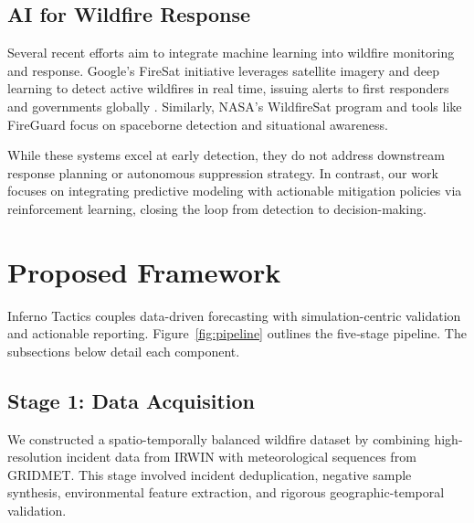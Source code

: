 \documentclass[conference]{IEEEtran}
\begin{document}
\subsection{AI for Wildfire Response}
Several recent efforts aim to integrate machine learning into wildfire monitoring and response. Google’s FireSat initiative leverages satellite imagery and deep learning to detect active wildfires in real time, issuing alerts to first responders and governments globally \cite{googlefiresat2023}. Similarly, NASA’s WildfireSat program \cite{wildfiresat2022} and tools like FireGuard focus on spaceborne detection and situational awareness.

While these systems excel at early detection, they do not address downstream response planning or autonomous suppression strategy. In contrast, our work focuses on integrating predictive modeling with actionable mitigation policies via reinforcement learning, closing the loop from detection to decision-making.

\section{Proposed Framework}

Inferno Tactics couples data-driven forecasting with simulation-centric validation and actionable reporting. Figure~\ref{fig:pipeline} outlines the five‐stage pipeline. The subsections below detail each component.

\subsection{Stage 1: Data Acquisition}
We constructed a spatio-temporally balanced wildfire dataset by combining high-resolution incident data from IRWIN with meteorological sequences from GRIDMET. This stage involved incident deduplication, negative sample synthesis, environmental feature extraction, and rigorous geographic-temporal validation.


\end{document}

